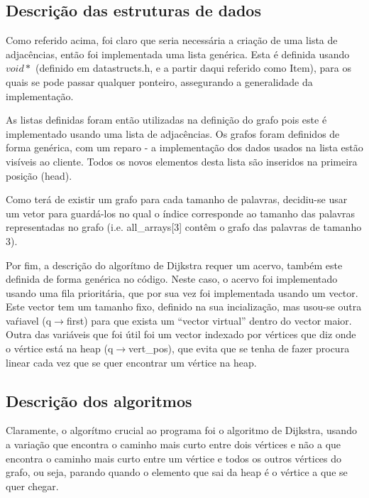 \documentclass[a4paper, 11pt]{article}
\begin{document}
\subsection{Descrição das estruturas de dados}
    \par Como referido acima, foi claro que seria necessária a criação de uma lista de adjacências, então foi implementada uma lista genérica. Esta é definida usando $void *$ (definido em datastructs.h, e a partir daqui referido como Item), para os quais se pode passar qualquer ponteiro, assegurando a generalidade da implementação.
    \par As listas definidas foram então utilizadas na definição do grafo pois este é implementado usando uma lista de adjacências. Os grafos foram definidos de forma genérica, com um reparo - a implementação dos dados usados na lista estão visíveis ao cliente. Todos os novos elementos desta lista são inseridos na primeira posição (head).
    \par Como terá de existir um grafo para cada tamanho de palavras, decidiu-se usar um vetor para guardá-los no qual o índice corresponde ao tamanho das palavras representadas no grafo (i.e. all{\_}arrays[3] contêm o grafo das palavras de tamanho 3).
    \par Por fim, a descrição do algorítmo de Dijkstra requer um acervo, também este definida de forma genérica no código. Neste caso, o acervo foi implementado usando uma fila prioritária, que por sua vez foi implementada usando um vector. Este vector tem um tamanho fixo, definido na sua incialização, mas usou-se outra vaŕiavel (q$\rightarrow$first) para que exista um ``vector virtual''  dentro do vector maior. Outra das variáveis que foi útil foi um vector indexado por vértices que diz onde o vértice está na heap (q$\rightarrow$vert{\_}pos), que evita que se tenha de fazer procura linear cada vez que se quer encontrar um vértice na heap.
    
\subsection{Descrição dos algoritmos}
    \par Claramente, o algorítmo crucial ao programa foi o algoritmo de Dijkstra, usando a variação que encontra o caminho mais curto entre dois vértices e não a que encontra o caminho mais curto entre um vértice e todos os outros vértices do grafo, ou seja, parando quando o elemento que sai da heap é o vértice a que se quer chegar.
    
\end{document}
